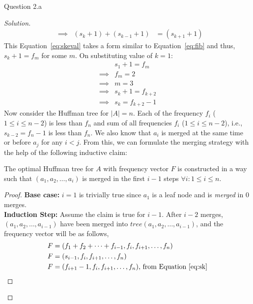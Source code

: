 \begin{solution}{Question 2.a}
\begin{proof}[Solution]
\begin{equation}
\begin{alignedat}{4}
                &\implies &(s_k+1)+(s_{k-1}+1) &=(s_{k+1}+1)
            \end{alignedat}
        \end{equation}
        This Equation~\ref{eq:skeval} takes a form similar to Equation~\ref{eq:fib} and thus, $s_k+1=f_m$ for some $m$. On substituting value of $k=1$:
        \begin{equation}\label{eq:sk}
            \begin{split}
                &s_1+1=f_m\\
                \implies &f_m=2\\
                \implies &m=3\\
                \implies &s_k+1=f_{k+2}\\
                \implies &s_k=f_{k+2}-1
            \end{split}
        \end{equation}
        Now consider the Huffman tree for $|A|=n$. Each of the frequency $f_i$ ($1\leq i\leq n-2$) is less than $f_n$ and sum of all frequencies $f_i$ ($1\leq i\leq n-2$), i.e., $s_{k-2}=f_n-1$ is less than $f_n$. We also know that $a_i$ is merged at the same time or before $a_j$ for any $i<j$. From this, we can formulate the merging strategy with the help of the following inductive claim:
        \begin{claim}\label{claim:moves}
            The optimal Huffman tree for $A$ with frequency vector $F$ is constructed in a way such that $(a_1, a_2, \ldots, a_i)$ is merged in the first $i-1$ steps $\forall i: 1\leq i\leq n$.
        \end{claim}
        \begin{proof}
            \textbf{Base case:} $i=1$ is trivially true since $a_1$ is a leaf node and is \textit{merged} in $0$ merges.\\
            \textbf{Induction Step:} Assume the claim is true for $i-1$. After $i-2$ merges, $(a_1, a_2, \ldots, a_{i-1})$ have been merged into $tree(a_1, a_2, \ldots, a_{i-1})$, and the frequency vector will be as follows,
            \begin{equation}
                \begin{split}
                    F &= \left(f_1+f_2+\cdots+f_{i-1}, f_i, f_{i+1}, \ldots, f_n\right)\\
                    F &= (s_{i-1}, f_i, f_{i+1}, \ldots, f_n)\\
                    F &= (f_{i+1}-1, f_i, f_{i+1}, \ldots, f_n)\text{, from Equation~\ref{eq:sk}}

\end{split}
\end{equation}
\end{proof}
\end{proof}
\end{solution}
